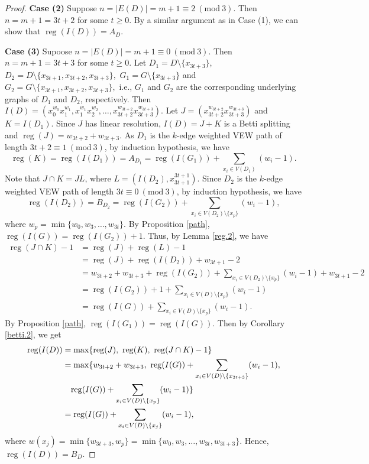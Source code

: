 \documentclass[11pt,reqno]{amsart}
\newcommand{\reg}{\operatorname{reg}}
\theoremstyle{definition}
\begin{document}
\begin{proof}
\textbf{Case (2)} Suppose $n=|E(D)| = m+1   \equiv 2~(\mbox{mod}~3)$. Then $n=m+1 = 3t+2$ for some $t \geq 0$. By a similar argument as in Case (1), we can show that $\reg(I(D))  =  A_D  $.    
 
\textbf{Case (3)} Supoose $n=|E(D)| = m+1  \equiv 0~(\mbox{mod}~3)$. Then $n=m+1 = 3t+3$ for some $t \geq 0$. Let $ D_1 = D\setminus \{x_{3t+3}\} $, $ D_2 = D\setminus \{ x_{3t+1},x_{3t+2},x_{3t+3} \} ,$ $ G_1 = G\setminus \{x_{3t+3}\} $ and $ G_2 = G\setminus \{ x_{3t+1},x_{3t+2},x_{3t+3} \} ,$ i.e., $ G_1 $ and $ G_2 $ are the corresponding underlying graphs of $D_1 $ and  $ D_2 $, respectively. Then
 $I(D)=(x_0^{w_{0}}x_1^{w_{1}},x_1^{w_{1}}x_2^{w_{2}},\ldots,x_{3t+2}^{w_{3t+2}}x_{3t+3}^{{w_{3t+3}}}).$  Let $ J = (x_{3t+2}^{w_{3t+2}}x_{3t+3}^{{w_{3t+3}}}) $ and $ K=I(D_1). $ Since $ J $ has linear resolution, $ I(D) = J + K $ is a Betti splitting and $ \reg(J)= w_{3t+2} + {w_{3t+3}} $. As $ D_1 $ is the $k$-edge weighted VEW path of length $ 3t+2 \equiv 1~(\mbox{mod}~3)$, by induction hypothesis, we have $$ \reg(K)=\reg(I(D_1))=A_{D_1}= \reg(I(G_1)) +   \displaystyle{ \sum_{x_i \in V(D_1) }}(w_i - 1).$$ Note that $ J \cap K= JL $, where $ L= (I(D_2),x_{3t+1}^{3t+1}) .$ Since $ D_2 $ is the $k$-edge weighted VEW path of length $ 3t \equiv 0~(\mbox{mod}~3) $, by induction hypothesis, we have $$\reg(I(D_2))=B_{D_2}= \reg(I(G_2)) +  \displaystyle{ \sum_{x_i \in V(D_2)\setminus \{x_p\}} (w_i - 1) },$$ where  $w_p = \min\{w_0,w_3,\ldots,w_{3t}\}$. By Proposition \ref{path}, $ \reg(I(G))= \reg(I(G_2)) + 1 .$ Thus, by Lemma \ref{reg.2}, we have   
 \begin{align*}
 	\reg(J\cap K) - 1&= \reg(J) + \reg(L)-1\\
 	&=\reg(J) + \reg(I(D_2)) + w_{3t+1} - 2\\
 	&= w_{3t+2} + {w_{3t+3}} + \reg(I(G_2)) +   \displaystyle{ \sum_{x_i \in V(D_2)\setminus \{x_p\}} (w_i - 1) } + w_{3t+1} - 2\\
 	&= \reg(I(G_2)) + 1 + \displaystyle{  \displaystyle{ \sum_{x_i \in V(D)\setminus \{x_p\} }}(w_i - 1) }\\
 	&=  \reg(I(G)) + \displaystyle{  \displaystyle{ \sum_{x_i \in V(D)\setminus \{x_p\} }}(w_i - 1) }.
 \end{align*} 
 By Proposition \ref{path}, $\reg(I(G_1)) = \reg(I(G))	.$  Then by Corollary \ref{betti.2}, we get    
 \begin{align*}
 	\reg(I(D)) &= \max\{ \reg(J),~\reg(K), ~\reg(J\cap K) - 1\}\\&= \max\{ w_{3t+2} + {w_{3t+3}},~\reg(I(G)) +   \displaystyle{ \sum_{x_i \in V(D)\setminus \{x_{3t+3}\} }}(w_i - 1) ,\\
  &\hspace*{0.3cm}  \reg(I(G)) + \displaystyle{  \displaystyle{ \sum_{x_i \in V(D)\setminus \{x_p\} }}(w_i - 1) }  \} \\
 	&=\reg(I(G)) + \displaystyle{  \displaystyle{ \sum_{x_i \in V(D)\setminus\{x_j\}}}(w_i - 1) },
    \end{align*}
    where $w(x_j)=\min\{w_{3t+3},w_p\}  = \min\{w_0,w_3,\ldots,w_{3t}, w_{3t+3}\}$. Hence, $\reg(I(D))=B_D$.

\end{proof}
\end{document}
